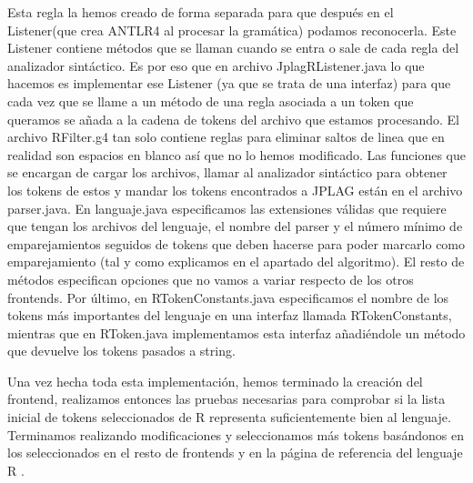 Esta regla la hemos creado de forma separada para que después en el Listener(que crea ANTLR4 al procesar la gramática) podamos reconocerla. Este Listener contiene métodos que se llaman cuando se entra o sale de cada regla del analizador sintáctico.
\newline
Es por eso que en archivo JplagRListener.java lo que hacemos es implementar ese Listener (ya que se trata de una interfaz) para que cada vez que se llame a un método de una regla asociada a un token que queramos se añada a la cadena de tokens del archivo que estamos procesando.
\newline
\newline
El archivo RFilter.g4 tan solo contiene reglas para eliminar saltos de linea que en realidad son espacios en blanco así que no lo hemos modificado.
\newline
Las funciones que se encargan de cargar los archivos, llamar al analizador sintáctico para obtener los tokens de estos y mandar los tokens encontrados a JPLAG están en el archivo parser.java.
\newline
En languaje.java especificamos las extensiones válidas que requiere que tengan los archivos del lenguaje, el nombre del parser y el número mínimo de emparejamientos seguidos de tokens que deben hacerse para poder marcarlo como emparejamiento (tal y como explicamos en el apartado del algoritmo). El resto de métodos especifican opciones que no vamos a variar respecto de los otros frontends.
\newline
Por último, en RTokenConstants.java especificamos el nombre de los tokens más importantes del lenguaje en una interfaz llamada RTokenConstants, mientras que en RToken.java implementamos esta interfaz añadiéndole un método que devuelve los tokens pasados a string.

\bigskip

Una vez hecha toda esta implementación, hemos terminado la creación del frontend, realizamos entonces las pruebas necesarias para comprobar si la lista inicial de tokens seleccionados de R representa suficientemente bien al lenguaje. 
\newline 
 Terminamos realizando modificaciones y seleccionamos más tokens basándonos en los seleccionados en el resto de frontends y en la página de referencia del lenguaje R \cite{R_language_definition}.

